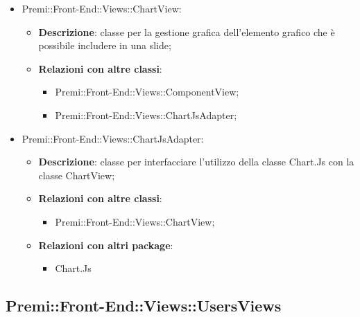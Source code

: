 \begin{itemize}
		\item Premi::Front-End::Views::ChartView:
		\begin{itemize}
			\item \textbf{Descrizione}: classe per la gestione grafica dell'elemento grafico che è possibile includere in una \gls{slide};
			\item \textbf{Relazioni con altre classi}:
			\begin{itemize}
				\item Premi::Front-End::Views::ComponentView;
				\item Premi::Front-End::Views::ChartJsAdapter;
			\end{itemize}
		\end{itemize}

		\item Premi::Front-End::Views::ChartJsAdapter:
		\begin{itemize}
			\item \textbf{Descrizione}: classe per interfacciare l'utilizzo della classe Chart.Js con la classe ChartView;
			\item \textbf{Relazioni con altre classi}:
			\begin{itemize}
				\item Premi::Front-End::Views::ChartView;
			\end{itemize}
			\item \textbf{Relazioni con altri package}:
			\begin{itemize}
				\item Chart.Js
			\end{itemize}
		\end{itemize}
	\end{itemize}


\subsection{Premi::Front-End::Views::UsersViews}

